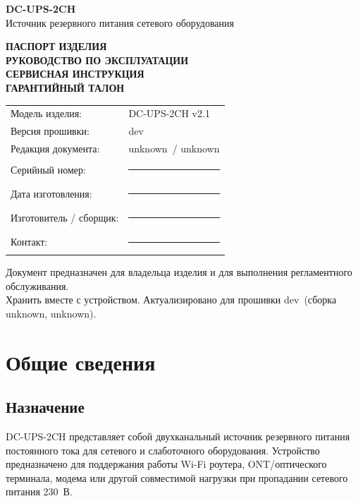 \documentclass[11pt,a4paper]{article}
\newcommand{\hwversion}{v2.1}%
\newcommand{\fwversion}{dev}%
\newcommand{\builddate}{unknown}%
\newcommand{\buildcommit}{unknown}%
\newcommand{\docrev}{unknown}%
\begin{document}
\begin{titlepage}
\centering
\vspace*{18mm}
{\sffamily\bfseries\fontsize{28}{34}\selectfont DC-UPS-2CH\\[3mm]}
{\sffamily\Large Источник резервного питания сетевого оборудования\\[12mm]}

\begin{tcolorbox}[width=0.85\textwidth,colback=lightaccent,colframe=accent,boxrule=0.8pt,arc=2mm]
\centering
{\Large\bfseries ПАСПОРТ ИЗДЕЛИЯ\\
РУКОВОДСТВО ПО ЭКСПЛУАТАЦИИ\\
СЕРВИСНАЯ ИНСТРУКЦИЯ\\
ГАРАНТИЙНЫЙ ТАЛОН}
\end{tcolorbox}

\vfill
\begin{tabular}{@{}p{55mm}p{90mm}@{}}
Модель изделия: & DC-UPS-2CH \hwversion \\
Версия прошивки: & \fwversion \\
Редакция документа: & \builddate\ / \docrev \\
Серийный номер: & \rule{70mm}{0.4pt} \\
Дата изготовления: & \rule{70mm}{0.4pt} \\
Изготовитель / сборщик: & \rule{70mm}{0.4pt} \\
Контакт: & \rule{70mm}{0.4pt} \\
\end{tabular}

\vfill
{\small Документ предназначен для владельца изделия и для выполнения регламентного обслуживания.\\
Хранить вместе с устройством. Актуализировано для прошивки \fwversion\ (сборка \buildcommit, \builddate).}
\end{titlepage}

\tableofcontents
\newpage

\section{Общие сведения}

\subsection{Назначение}
DC-UPS-2CH представляет собой двухканальный источник резервного питания постоянного тока для сетевого и слаботочного оборудования. Устройство предназначено для поддержания работы Wi-Fi роутера, ONT/оптического терминала, модема или другой совместимой нагрузки при пропадании сетевого питания 230~В.
\end{document}

